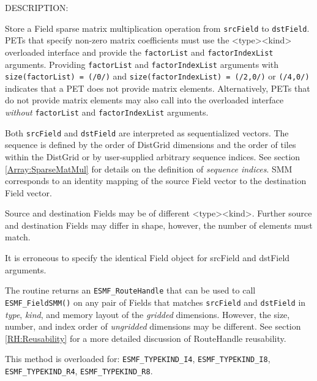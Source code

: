{\sf DESCRIPTION:\\ }

 
   
   \begin{sloppypar}
   Store a Field sparse matrix multiplication operation from {\tt srcField}
   to {\tt dstField}. PETs that specify non-zero matrix coefficients must use
   the <type><kind> overloaded interface and provide the {\tt factorList} and
   {\tt factorIndexList} arguments. Providing {\tt factorList} and
   {\tt factorIndexList} arguments with {\tt size(factorList) = (/0/)} and
   {\tt size(factorIndexList) = (/2,0/)} or {\tt (/4,0/)} indicates that a 
   PET does not provide matrix elements. Alternatively, PETs that do not 
   provide matrix elements may also call into the overloaded interface
   {\em without} {\tt factorList} and {\tt factorIndexList} arguments.
   \end{sloppypar}
    
   Both {\tt srcField} and {\tt dstField} are interpreted as sequentialized 
   vectors. The 
   sequence is defined by the order of DistGrid dimensions and the order of 
   tiles within the DistGrid or by user-supplied arbitrary sequence indices. See 
   section \ref{Array:SparseMatMul} for details on the definition of {\em sequence indices}. 
   SMM corresponds to an identity mapping of the source Field vector to 
   the destination Field vector. 
    
   Source and destination Fields may be of different <type><kind>. Further source 
   and destination Fields may differ in shape, however, the number of elements 
   must match. 
    
   It is erroneous to specify the identical Field object for srcField and dstField 
   arguments.
  
     The routine returns an {\tt ESMF\_RouteHandle} that can be used to call 
     {\tt ESMF\_FieldSMM()} on any pair of Fields that matches 
     {\tt srcField} and {\tt dstField} in {\em type}, {\em kind}, and 
     memory layout of the {\em gridded} dimensions. However, the size, number, 
     and index order of {\em ungridded} dimensions may be different. See section
     \ref{RH:Reusability} for a more detailed discussion of RouteHandle 
     reusability.
    
   This method is overloaded for:\newline
   {\tt ESMF\_TYPEKIND\_I4}, {\tt ESMF\_TYPEKIND\_I8},\newline 
   {\tt ESMF\_TYPEKIND\_R4}, {\tt ESMF\_TYPEKIND\_R8}.
   \newline
    
